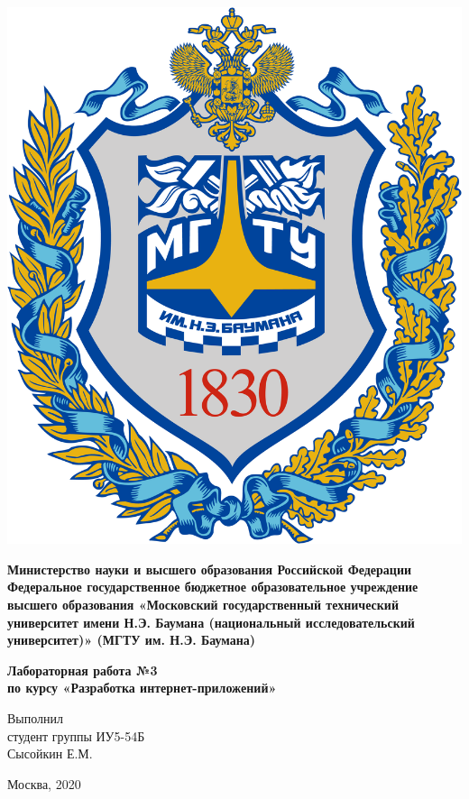 \documentclass[20pt,a4paper]{report}
\begin{document}
	\begin{titlepage}
		\begin{minipage}{0.3\textwidth}
		\includegraphics[scale=0.03]{logo.png}	
		\end{minipage}
		\begin{minipage}{0.6\textwidth}\centering
			\textbf{
				Министерство науки и высшего образования Российской Федерации
				Федеральное государственное бюджетное образовательное 
				учреждение высшего образования
				«Московский государственный технический университет
				имени Н.Э. Баумана (национальный исследовательский университет)»
				(МГТУ им. Н.Э. Баумана)
			}	
		\end{minipage}
	
		\vspace{5cm}
		\centering
		\Large
		\textbf{
			Лабораторная работа №3 \\
			по курсу «Разработка интернет-приложений» \\
		}

		\vspace{6cm}
		\begin{flushright}
			Выполнил \\ 
			студент группы ИУ5-54Б \\ 
			Сысойкин Е.М. 
		\end{flushright}
		\vspace{5cm}
		Москва, 2020
	\end{titlepage}
\end{document}
